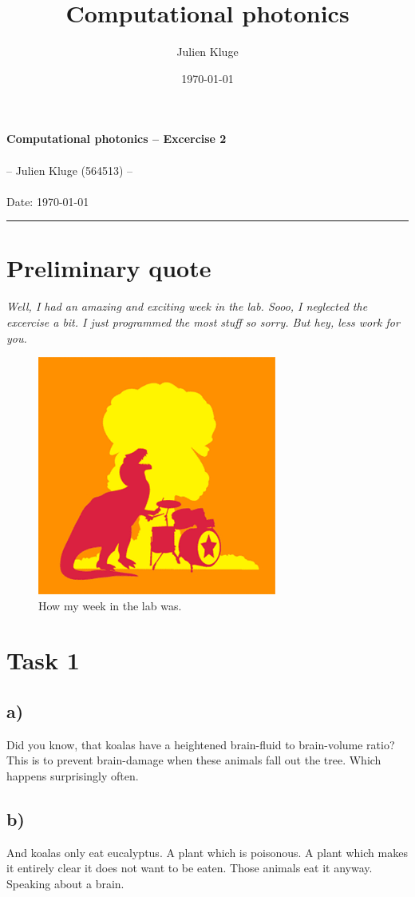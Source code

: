 \documentclass[12pt,a4paper]{article}
\title{Computational photonics}
\author{Julien Kluge}
\date{\today}
\begin{document}
\lstset{numbers=left}

\begin{center}
\large{\textbf{Computational photonics -- Excercise 2}} \\
~\\
\small{-- Julien Kluge (564513) --}\\
~\\
Date: \today
\end{center}
\hrule

\section*{Preliminary quote}
	\textit{Well, I had an amazing and exciting week in the lab. Sooo, I neglected the excercise a bit.
	I just programmed the most stuff so sorry. But hey, less work for you.}
	\begin{figure}[H]
		\centering
		\includegraphics[width=0.7\textwidth]{awesome.jpg}
		\caption[]{How my week in the lab was.}
	\end{figure}

\section*{Task 1}
	\subsection*{a)}
		Did you know, that koalas have a heightened brain-fluid to brain-volume ratio? This is to prevent brain-damage when
		these animals fall out the tree. Which happens surprisingly often.
	\subsection*{b)}
		And koalas only eat eucalyptus. A plant which is poisonous. A plant which makes it entirely clear it does not
		want to be eaten. Those animals eat it anyway. Speaking about a brain.
\end{document}
